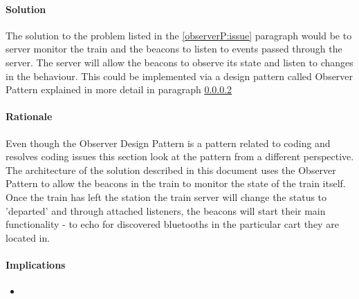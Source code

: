 \iffalse

	Therefore there is a clash of requirements which can be solved by implementing a version of a design pattern called the Observer Pattern configured to suit the needs to both be energy efficient and fault-proof. 

	This however creates an issue that the beacons should be allowed to operate on their own and they should also monitor the state of the train.
 \fi


\paragraph{Solution} 
	The solution to the problem listed in the \ref{observerP:issue} paragraph would be to server monitor the train and the beacons to listen to events passed through the server. The server will allow the beacons to observe its state and listen to changes in the behaviour. This could be implemented via a design pattern called Observer Pattern explained in more detail in paragraph \ref{observerP:rationale}


\paragraph{Rationale} \label{observerP:rationale}
	Even though the Observer Design Pattern is a pattern related to coding and resolves coding issues this section look at the pattern from a different perspective. The architecture of the solution described in this document uses the Observer Pattern to allow the beacons in the train to monitor the state of the train itself. Once the train has left the station the train server will change the status to 'departed' and through attached listeners, the beacons will start their main functionality - to echo for discovered bluetooths in the particular cart they are located in.

\paragraph{Implications}
\begin{itemize}
  \item 
\end{itemize}

